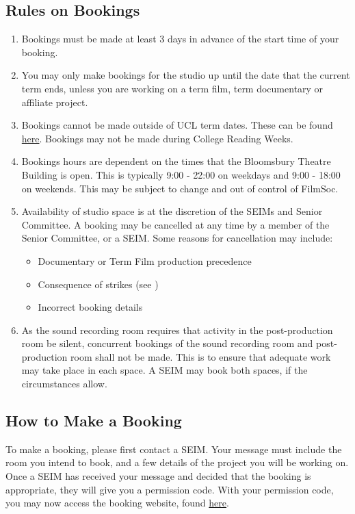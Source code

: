 \documentclass[]{article}
\begin{document}
\subsection{Rules on Bookings}
\begin{enumerate}
    \item Bookings must be made at least 3 days in advance of the start time of your booking.
    \item You may only make bookings for the studio up until the date that the current term ends, unless you are working on a term film, term documentary or affiliate project.
    \item Bookings cannot be made outside of UCL term dates. These can be found \href{https://www.ucl.ac.uk/students/life-ucl/term-dates-and-closures/term-dates-and-closures-2022-23}{here}. Bookings may not be made during College Reading Weeks.
    \item Bookings hours are dependent on the times that the Bloomsbury Theatre Building is open. This is typically 9:00 - 22:00 on weekdays and 9:00 - 18:00 on weekends. This may be subject to change and out of control of FilmSoc.
    \item Availability of studio space is at the discretion of the SEIMs and Senior Committee. A booking may be cancelled at any time by a member of the Senior Committee, or a SEIM. Some reasons for cancellation may include:
          \begin{itemize}
              \item Documentary or Term Film production precedence
              \item Consequence of strikes (see )
              \item Incorrect booking details
          \end{itemize}
    \item As the sound recording room requires that activity in the post-production room be silent, concurrent bookings of the sound recording room and post-production room shall not be made. This is to ensure that adequate work may take place in each space. A SEIM may book both spaces, if the circumstances allow.
\end{enumerate}
\subsection{How to Make a Booking}
To make a booking, please first contact a SEIM. Your message must include the room you intend to book, and a few details of the project you will be working on. Once a SEIM has received your message and decided that the booking is appropriate, they will give you a permission code. With your permission code, you may now access the booking website, found \href{https://ucl-film-tv-society.booqable.shop/}{here}.
\end{document}
